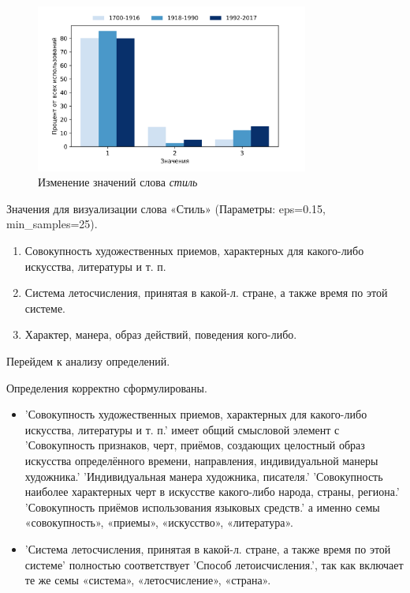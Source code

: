 \begin{figure}[H]
	\centering
	\includegraphics[width=0.8\textwidth]{img/visualizations/stil'_minimal}
	\caption{Изменение значений слова \textit{стиль}}
	\label{fig:Стиль_книга}
\end{figure}

Значения для визуализации слова «Стиль» (Параметры: eps=0.15, min\_samples=25).

\begin{enumerate}
    \item Совокупность художественных приемов, характерных для какого-либо искусства, литературы и т. п.
    \item Система летосчисления, принятая в какой-л. стране, а также время по этой системе.
    \item Характер, манера, образ действий, поведения кого-либо.
\end{enumerate}

Перейдем к анализу определений.

Определения корректно сформулированы.

\begin{itemize}
    \item ’Совокупность художественных приемов, характерных для какого-либо искусства, литературы и т. п.’ имеет общий смысловой элемент с
’Совокупность признаков, черт, приёмов, создающих целостный образ искусства определённого времени, направления, индивидуальной манеры художника.’
’Индивидуальная манера художника, писателя.’
’Совокупность наиболее характерных черт в искусстве какого-либо народа, страны, региона.’
’Совокупность приёмов использования языковых средств.’
а именно семы «совокупность», «приемы», «искусство», «литература».

    \item ’Система летосчисления, принятая в какой-л. стране, а также время по этой системе’ полностью соответствует
’Способ летоисчисления.’, так как включает те же семы «система», «летосчисление», «страна».
\end{itemize}

